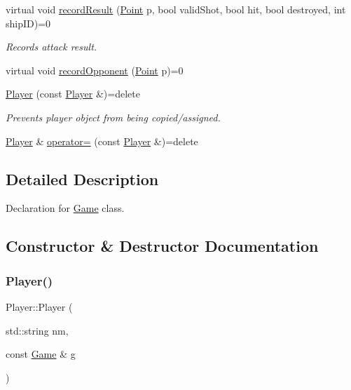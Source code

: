 \begin{DoxyCompactItemize}
\item 
virtual void \mbox{\hyperlink{class_player_a368527cfefaac58dc942b32658f977ed}{record\+Result}} (\mbox{\hyperlink{class_point}{Point}} p, bool valid\+Shot, bool hit, bool destroyed, int ship\+ID)=0
\begin{DoxyCompactList}\small\item\em Records attack result. \end{DoxyCompactList}\item 
virtual void \mbox{\hyperlink{class_player_a768e14edee61e208e6fd295cdd72a49c}{record\+Opponent}} (\mbox{\hyperlink{class_point}{Point}} p)=0
\item 
\mbox{\hyperlink{class_player_ae8015d1f08ba69d663cfdaea1a64d1a4}{Player}} (const \mbox{\hyperlink{class_player}{Player}} \&)=delete
\begin{DoxyCompactList}\small\item\em Prevents player object from being copied/assigned. \end{DoxyCompactList}\item 
\mbox{\hyperlink{class_player}{Player}} \& \mbox{\hyperlink{class_player_ab81d34e4adb4e329d26b1635d866462d}{operator=}} (const \mbox{\hyperlink{class_player}{Player}} \&)=delete
\end{DoxyCompactItemize}


\subsection{Detailed Description}
Declaration for \mbox{\hyperlink{class_game}{Game}} class. 

\subsection{Constructor \& Destructor Documentation}
\mbox{\label{class_player_adebc0e1afa34a20c0be570f8e9e3a9bf}} 
\subsubsection{\texorpdfstring{Player()}{Player()}\hspace{0.1cm}{\footnotesize\ttfamily [1/2]}}
{\footnotesize\ttfamily Player\+::\+Player (\begin{DoxyParamCaption}\item[{std\+::string}]{nm,  }\item[{const \mbox{\hyperlink{class_game}{Game}} \&}]{g }\end{DoxyParamCaption})\hspace{0.3cm}{\ttfamily [inline]}}



